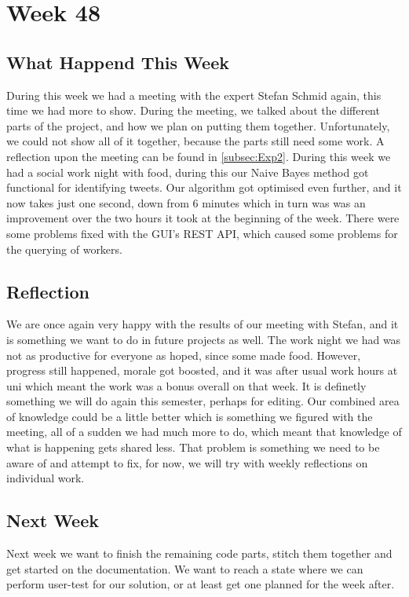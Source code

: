\section*{Week 48} 
\subsection*{What Happend This Week}
During this week we had a meeting with the expert Stefan Schmid again, this time
we had more to show. During the meeting, we talked about the different parts of the
project, and how we plan on putting them together. Unfortunately, we could not
show all of it together, because the parts still need some work. A reflection
upon the meeting can be found in \autoref{subsec:Exp2}.
During this week we had a social work night with food, during this our Naive
Bayes method got functional for identifying tweets. Our algorithm got optimised
even further, and it now takes just one second, down from 6 minutes which in
turn was was an improvement over the two hours it took at the beginning of the
week.
There were some problems fixed with the \ac{GUI}'s \ac{REST} \ac{API}, which caused some problems for the querying of workers.

\subsection*{Reflection}
We are once again very happy with the results of our meeting with Stefan, and it
is something we want to do in future projects as well. The work night we had was
not as productive for everyone as hoped, since some made food. However, progress
still happened, morale got boosted, and it was after usual work hours at uni
which meant the work was a bonus overall on that week. It is definetly something
we will do again this semester, perhaps for editing. Our combined area of
knowledge could be a little better which is something we figured with the
meeting, all of a sudden we had much more to do, which meant that knowledge of
what is happening gets shared less. That problem is something we need to be
aware of and attempt to fix, for now, we will try with weekly reflections on
individual work.

\subsection*{Next Week}
Next week we want to finish the remaining code parts, stitch them together and
get started on the documentation. We want to reach a state where we can perform
user-test for our solution, or at least get one planned for the week after.


